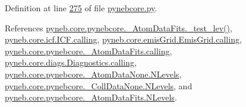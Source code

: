 Definition at line \hyperlink{pynebcore_8py_source_l00275}{275} of file \hyperlink{pynebcore_8py_source}{pynebcore.\-py}.



References \hyperlink{pynebcore_8py_source_l00178}{pyneb.\-core.\-pynebcore.\-\_\-\-Atom\-Data\-Fits.\-\_\-test\-\_\-lev()}, \hyperlink{icf_8py_source_l00016}{pyneb.\-core.\-icf.\-I\-C\-F.\-calling}, \hyperlink{emis_grid_8py_source_l00044}{pyneb.\-core.\-emis\-Grid.\-Emis\-Grid.\-calling}, \hyperlink{pynebcore_8py_source_l00097}{pyneb.\-core.\-pynebcore.\-\_\-\-Atom\-Data\-Fits.\-calling}, \hyperlink{diags_8py_source_l00169}{pyneb.\-core.\-diags.\-Diagnostics.\-calling}, \hyperlink{pynebcore_8py_source_l00069}{pyneb.\-core.\-pynebcore.\-\_\-\-Atom\-Data\-None.\-N\-Levels}, \hyperlink{pynebcore_8py_source_l00082}{pyneb.\-core.\-pynebcore.\-\_\-\-Coll\-Data\-None.\-N\-Levels}, and \hyperlink{pynebcore_8py_source_l00098}{pyneb.\-core.\-pynebcore.\-\_\-\-Atom\-Data\-Fits.\-N\-Levels}.


